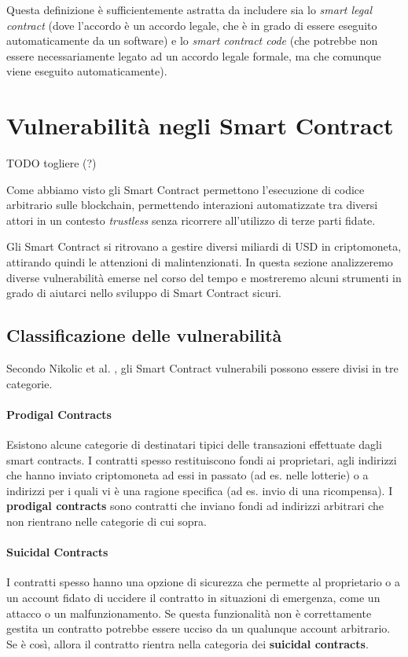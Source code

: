 \endgroup
Questa definizione è sufficientemente astratta da includere sia lo \textit{smart legal contract}
(dove l'accordo è un accordo legale, che è in grado di essere eseguito automaticamente da un software)
e lo \textit{smart contract code} (che potrebbe non essere necessariamente legato ad un accordo legale formale,
ma che comunque viene eseguito automaticamente).



\section{Vulnerabilità negli Smart Contract}
TODO togliere (?)

Come abbiamo visto gli Smart Contract permettono l'esecuzione di codice arbitrario
sulle blockchain, permettendo interazioni automatizzate tra diversi attori in un contesto
\textit{trustless} senza ricorrere all'utilizzo di terze parti fidate.

Gli Smart Contract si ritrovano a gestire diversi miliardi di USD in criptomoneta,
attirando quindi le attenzioni di malintenzionati. In questa sezione analizzeremo
diverse vulnerabilità emerse nel corso del tempo e mostreremo
alcuni strumenti in grado di aiutarci nello sviluppo di Smart Contract sicuri.

\subsection{Classificazione delle vulnerabilità}
Secondo Nikolic et al. \cite{Nikolic2018FindingTG},
gli Smart Contract vulnerabili possono essere divisi in tre categorie.

\paragraph{Prodigal Contracts}
Esistono alcune categorie di destinatari tipici delle transazioni effettuate
dagli smart contracts. I contratti spesso restituiscono fondi ai
proprietari, agli indirizzi che hanno inviato
criptomoneta ad essi in passato (ad es. nelle lotterie) o a indirizzi
per i quali vi è una ragione specifica (ad es. invio di una ricompensa).
I \textbf{prodigal contracts} sono contratti che inviano fondi ad
indirizzi arbitrari che non rientrano nelle categorie di cui sopra.

\paragraph{Suicidal Contracts}
I contratti spesso hanno una opzione di sicurezza che permette al proprietario
o a un account fidato di uccidere il contratto in situazioni di emergenza,
come un attacco o un malfunzionamento. Se questa funzionalità non è correttamente gestita
un contratto potrebbe essere ucciso da un qualunque account arbitrario.
Se è così, allora il contratto rientra nella categoria dei \textbf{suicidal contracts}.

